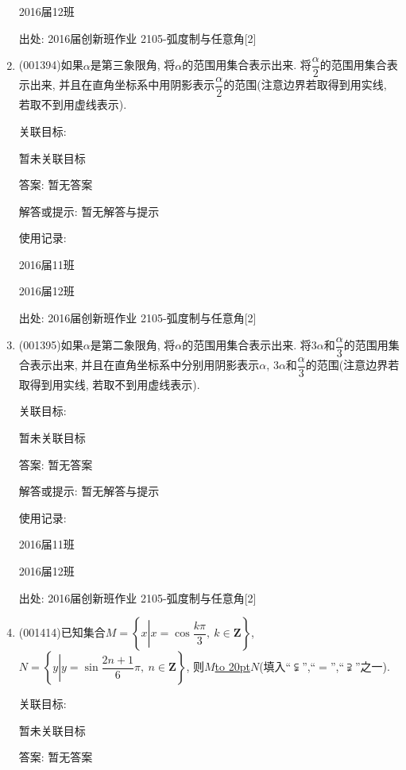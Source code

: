 \documentclass[10pt,a4paper]{article}
\newcommand{\blank}[1]{\underline{\hbox to #1pt{}}}
\begin{document}
\begin{enumerate}[1.]
2016届12班								


出处: 2016届创新班作业	2105-弧度制与任意角[2]
\item { (001394)}如果$\alpha$是第三象限角, 将$\alpha$的范围用集合表示出来. 将$\dfrac{\alpha}{2}$的范围用集合表示出来, 并且在直角坐标系中用阴影表示$\dfrac{\alpha}{2}$的范围(注意边界若取得到用实线, 若取不到用虚线表示).


关联目标:

暂未关联目标

答案: 暂无答案

解答或提示: 暂无解答与提示

使用记录:

2016届11班	

2016届12班	


出处: 2016届创新班作业	2105-弧度制与任意角[2]
\item { (001395)}如果$\alpha$是第二象限角, 将$\alpha$的范围用集合表示出来. 将$3\alpha$和$\dfrac{\alpha}{3}$的范围用集合表示出来, 并且在直角坐标系中分别用阴影表示$\alpha$, $3\alpha$和$\dfrac{\alpha}{3}$的范围(注意边界若取得到用实线, 若取不到用虚线表示).


关联目标:

暂未关联目标

答案: 暂无答案

解答或提示: 暂无解答与提示

使用记录:

2016届11班	

2016届12班	


出处: 2016届创新班作业	2105-弧度制与任意角[2]
\item { (001414)}已知集合$M=\left\{x\left|x=\cos\dfrac{k\pi}{3}, \ k \in \mathbf{Z}\right.\right\}$, $N=\left\{y\left|y=\sin\dfrac{2n+1}{6}\pi,\ n \in \mathbf{Z}\right.\right\}$, 则$M$\blank{20}$N$(填入``$\subsetneqq$'',``$=$'',``$\supsetneqq$''之一).


关联目标:

暂未关联目标

答案: 暂无答案


\end{enumerate}
\end{document}
